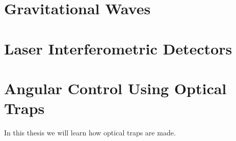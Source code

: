 \section{Gravitational Waves}

\section{Laser Interferometric Detectors}

\section{Angular Control Using Optical Traps}

In this thesis we will learn how optical traps are made.

